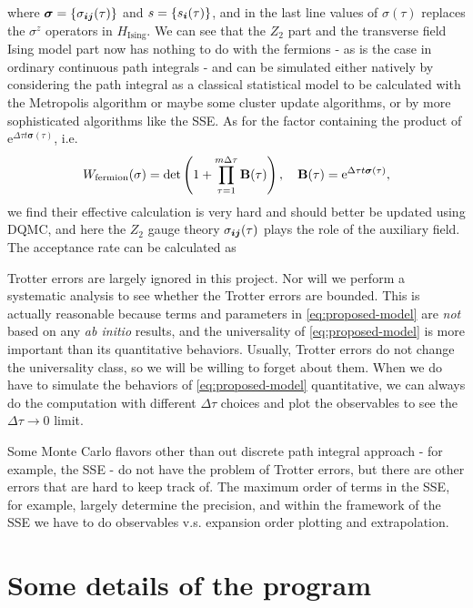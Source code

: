 \documentclass[hyperref, a4paper]{article}
\newcommand*{\ee}{\mathrm{e}}
\newcommand*{\Ztwo}{\texorpdfstring{$\mathbb{Z}_2$ }{Z2 }}
\newcommand*{\tfim}{transverse field Ising model}
\def\mathbb#1{#1}%
\begin{document}
where $\bm{\sigma} = \{\sigma_{\vb*{i} \vb*{j}}(\tau)\}$ and $s = \{s_{\vb*{i}}(\tau)\}$, 
and in the last line values of $\sigma(\tau)$ replaces the $\sigma^z$ operators in $H_\text{Ising}$.
We can see that the \Ztwo part and the \tfim{} part now has nothing to do with the fermions - as is the case in ordinary continuous path integrals - and can be simulated either natively by considering the path integral as a classical statistical model to be calculated with the Metropolis algorithm or maybe some cluster update algorithms, or by more sophisticated algorithms like the SSE.
As for the factor containing the product of $\ee^{\Delta\tau t \bm{\sigma}(\tau)}$, i.e. 
\begin{equation}
    W_\text{fermion}(\sigma) = \det \left(1 + \prod_{\tau = 1}^{m\Delta \tau} \vb{B}(\tau) \right), \quad \vb{B}(\tau) =  \ee^{\Delta \tau t \bm{\sigma}(\tau)},
\end{equation}
we find their effective calculation is very hard and should better be updated using DQMC, and here the \Ztwo gauge theory $\sigma_{\vb*{i} \vb*{j}}(\tau)$ plays the role of the auxiliary field.
The acceptance rate can be calculated as 

Trotter errors are largely ignored in this project. Nor will we perform a systematic analysis to see whether the Trotter errors are bounded.
This is actually reasonable because terms and parameters in \eqref{eq:proposed-model} are \emph{not} based on any \emph{ab initio} results, and the universality of \eqref{eq:proposed-model} is more important than its quantitative behaviors.
Usually, Trotter errors do not change the universality class, so we will be willing to forget about them.
When we do have to simulate the behaviors of \eqref{eq:proposed-model} quantitative, we can always do the computation with different $\Delta \tau$ choices and plot the observables to see the $\Delta \tau \to 0$ limit.

Some Monte Carlo flavors other than out discrete path integral approach - for example, the SSE - do not have the problem of Trotter errors, but there are other errors that are hard to keep track of.
The maximum order of terms in the SSE, for example, largely determine the precision, and within the framework of the SSE we have to do observables v.s. expansion order plotting and extrapolation.

\section{Some details of the program}
\end{document}
